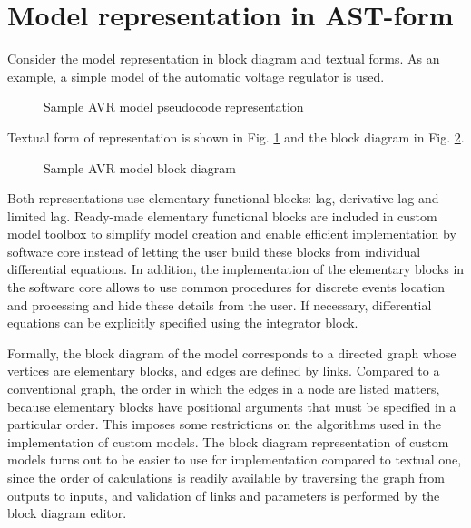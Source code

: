 \documentclass[lettersize,journal]{IEEEtran}
\begin{document}
\section{Model representation in AST-form}
Consider the model representation in block diagram and textual forms. As an example, a simple model of the automatic voltage regulator is used. 
\begin{figure}[h]
	\centering
	\caption{Sample AVR model pseudocode representation}
	\label{fig_avrcode}
\end{figure}
Textual form of representation is shown in Fig. \ref{fig_avrcode} and the block diagram in Fig. \ref{fig_avr}.
\begin{figure}[h]
	\centering
	\caption{Sample AVR model block diagram}
	\label{fig_avr}
\end{figure}

Both representations use elementary functional blocks: lag, derivative lag and limited lag. Ready-made elementary functional
blocks are included in custom model toolbox to simplify model creation and enable efficient implementation by software core 
instead of letting the user build these blocks from individual differential equations.
In addition, the implementation of the elementary blocks in the software core allows to use common procedures for discrete events 
location and processing and hide these details from the user. 
If necessary, differential equations can be explicitly specified using the integrator block.

Formally, the block diagram of the model corresponds to a directed graph whose vertices are elementary blocks, and
edges are defined by links. Compared to a conventional graph, the order in which the edges in a node are listed matters,
because elementary blocks have positional arguments that must be specified in a particular order. This imposes some restrictions
on the algorithms used in the implementation of custom models. The block diagram representation of custom models
turns out to be easier to use for implementation compared to textual one, since the order of calculations is readily
available by traversing the graph from outputs to inputs, and validation of links and parameters is performed by the 
block diagram editor.
\end{document}
